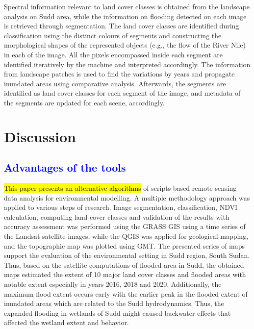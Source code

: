 \documentclass[analytics,article,submit,pdftex,moreauthors]{Definitions/mdpi}
\begin{document}
Spectral information relevant to land cover classes is obtained from the landscape analysis on Sudd area, while the information on flooding detected on each image is retrieved through segmentation. The land cover classes are identified during classification using the distinct colours of segments and constructing the morphological shapes of the represented objects (e.g., the flow of the River Nile) in each of the image. All the pixels encompassed inside each segment are identified iteratively by the machine and interpreted accordingly. The information from landscape patches is used to find the variations by years and propagate inundated areas using comparative analysis. Afterwards, the segments are identified as land cover classes for each segment of the image, and metadata of the segments are updated for each scene, accordingly. 

\section{Discussion}

\subsection{\textcolor{blue}{Advantages of the tools}}

\hl{This paper presents an alternative algorithms} of scripts-based remote sensing data analysis for environmental modelling. A multiple methodology approach was applied to various steps of research. Image segmentation, classification, NDVI calculation, computing land cover classes and validation of the results with accuracy assessment was performed using the GRASS GIS using a time series of the Landsat satellite images, while the QGIS was applied for geological mapping, and the topographic map was plotted using GMT. The presented series of maps support the evaluation of the environmental setting in Sudd region, South Sudan. Thus, based on the satellite computations of flooded area in Sudd, the obtained maps estimated the extent of 10 major land cover classes and flooded areas with notable extent especially in years 2016, 2018 and 2020. Additionally, the maximum flood extent occurs early with  the earlier peak in the flooded extent  of inundated areas which are related to the Sudd hydrodynamics. Thus, the expanded flooding in wetlands of Sudd might caused backwater effects that affected the wetland extent and behavior. 
\end{document}
